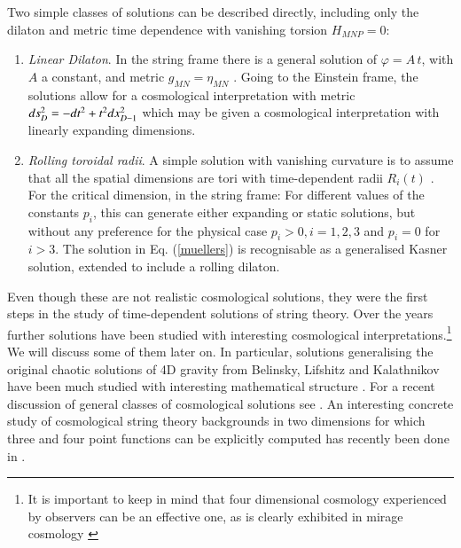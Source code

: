 Two simple classes of solutions can be described directly, including only the dilaton and metric time dependence with vanishing torsion $H_{MNP}=0$:
\begin{enumerate}
\item {\it Linear Dilaton}. 
In the string frame there is a general solution of $\varphi=A\,t$, with $A$ a constant, and  metric $g_{MN}=\eta_{MN}$ \cite{Myers:1987fv,Antoniadis:1988vi}. Going to the Einstein frame, the solutions allow for a cosmological interpretation with
metric $ds_D^2=-dt^2+t^2 dx_{\small D-1}^2$ which may be given a cosmological interpretation with linearly expanding dimensions.
\item{\it Rolling toroidal radii}. 
A simple solution with vanishing curvature is to assume that all the spatial dimensions are tori with time-dependent radii $R_i(t)$ \cite{Mueller:1989in}. For the critical dimension, in the string frame:
\be
\setlength\fboxsep{0.25cm}
\setlength\fboxrule{0.4pt}
\ee
For different values of the constants $p_i$, this can generate either expanding or static solutions, but without any preference for the physical case $p_i>0, i=1,2,3$ and $p_i=0$ for $i>3$. The solution in Eq. (\ref{muellers}) is recognisable as a generalised Kasner solution, extended to include a rolling dilaton.
\end{enumerate}
Even though these are not realistic cosmological solutions, they were the first steps in the study of time-dependent solutions of string theory. Over the years further solutions have been studied with interesting cosmological interpretations.\footnote{It is important to keep in mind that four dimensional cosmology experienced by observers can be an effective one, as is clearly exhibited in  mirage cosmology
\cite{Kehagias:1999vr}}
 We will discuss some of them later on. In particular, solutions generalising the original chaotic solutions of 4D gravity from Belinsky, Lifshitz and Kalathnikov \cite{Belinsky:1970ew,Belinsky:1982pk}  have been much studied with interesting mathematical structure \cite{Damour:2000wm,Damour:2002et,Belinski:2017fas}. For a recent discussion of general classes of cosmological solutions see \cite{Hohm:2019jgu,Russo:2022pgo}. An interesting concrete study of  cosmological string theory backgrounds in two dimensions for which  three and four point functions can be explicitly computed has recently been done in \cite{Rodriguez:2023kkl}.

